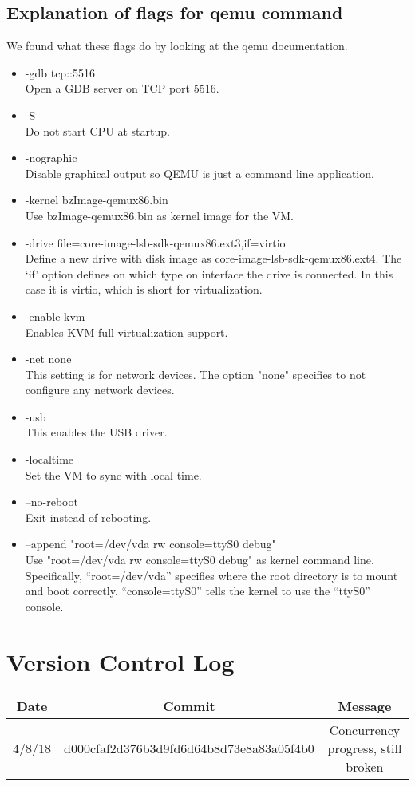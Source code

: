 \documentclass[onecolumn, draftclsnofoot,10pt, compsoc]{IEEEtran}
\begin{document}
\subsection{Explanation of flags for qemu command}
We found what these flags do by looking at the qemu documentation. \cite{qemu_ref}
\begin{itemize}
\item -gdb tcp::5516 \\
Open a GDB server on TCP port 5516.
\item -S \\
Do not start CPU at startup.
\item -nographic \\
Disable graphical output so QEMU is just a command line application.
\item -kernel bzImage-qemux86.bin \\
Use bzImage-qemux86.bin as kernel image for the VM.
\item -drive file=core-image-lsb-sdk-qemux86.ext3,if=virtio \\
Define a new drive with disk image as core-image-lsb-sdk-qemux86.ext4. The ‘if’ option defines on which type on interface the drive is connected. In this case it is virtio, which is short for virtualization.
\item -enable-kvm \\
Enables KVM full virtualization support.
\item -net none \\
This setting is for network devices. The option "none" specifies to not configure any network devices.
\item -usb \\ 
This enables the USB driver.
\item -localtime \\ 
Set the VM to sync with local time.
\item --no-reboot \\
Exit instead of rebooting.
\item --append "root=/dev/vda rw console=ttyS0 debug" \\
Use "root=/dev/vda rw console=ttyS0 debug" as kernel command line. Specifically, “root=/dev/vda” specifies where the root directory is to mount and boot correctly. “console=ttyS0” tells the kernel to use the “ttyS0” console.
\end{itemize}

\section{Version Control Log}
\begin{center}
 \begin{tabular}{||c c c||} 
 \hline
 Date & Commit & Message \\ [0.5ex] 
 \hline\hline
 4/8/18 & d000cfaf2d376b3d9fd6d64b8d73e8a83a05f4b0 & Concurrency progress, still broken\\ 
 [1ex] 
 \hline
\end{tabular}
\end{center}
\end{document}
